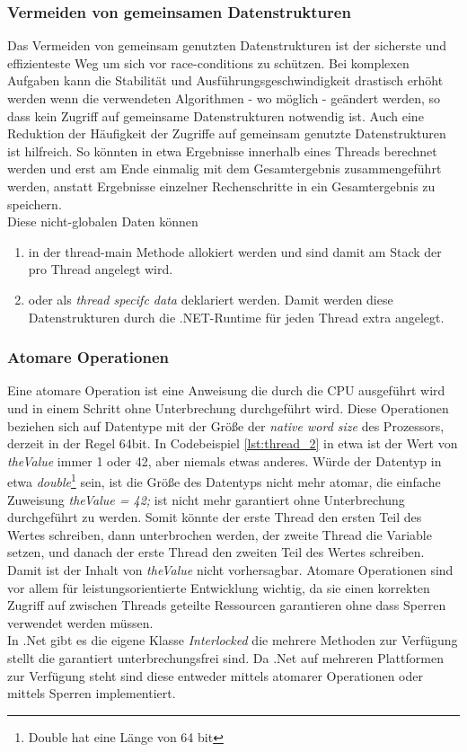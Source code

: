 \subsubsection{Vermeiden von gemeinsamen Datenstrukturen}	
Das Vermeiden von gemeinsam genutzten Datenstrukturen ist der sicherste und effizienteste Weg um sich vor race-conditions zu schützen. Bei komplexen Aufgaben kann die Stabilität und Ausführungsgeschwindigkeit drastisch erhöht werden wenn die verwendeten Algorithmen - wo möglich - geändert werden, so dass kein Zugriff auf gemeinsame Datenstrukturen notwendig ist. Auch eine Reduktion der Häufigkeit der Zugriffe auf gemeinsam genutzte Datenstrukturen ist hilfreich. So könnten in etwa Ergebnisse innerhalb eines Threads berechnet werden und erst am Ende einmalig mit dem Gesamtergebnis zusammengeführt werden, anstatt Ergebnisse einzelner Rechenschritte in ein Gesamtergebnis zu speichern.
\\Diese nicht-globalen Daten können
\begin{enumerate}
	\item in der thread-main Methode allokiert werden und sind damit am Stack der pro Thread angelegt wird.
	\item oder als \textit{thread specifc data} deklariert werden. Damit werden diese Datenstrukturen durch die .NET-Runtime für jeden Thread extra angelegt.
\end{enumerate}

\subsubsection{Atomare Operationen}	
Eine atomare Operation ist eine Anweisung die durch die CPU ausgeführt wird und in einem Schritt ohne Unterbrechung durchgeführt wird. Diese Operationen beziehen sich auf Datentype mit der Größe der \textit{native word size} des Prozessors\parencite[S. 102]{ecma335}, derzeit in der Regel 64bit. In Codebeispiel \ref{lst:thread_2}  in etwa ist der Wert von \textit{theValue} immer 1 oder 42, aber niemals etwas anderes. Würde der Datentyp in etwa \textit{double}\footnote{Double hat eine Länge von 64 bit} sein, ist die Größe des Datentyps nicht mehr atomar, die einfache Zuweisung \textit{theValue = 42;} ist nicht mehr garantiert ohne Unterbrechung durchgeführt zu werden. Somit könnte der erste Thread den ersten Teil des Wertes schreiben, dann unterbrochen werden, der zweite Thread die Variable setzen, und danach der erste Thread den zweiten Teil des Wertes schreiben. Damit ist der Inhalt von \textit{theValue} nicht vorhersagbar. Atomare Operationen sind vor allem für leistungsorientierte Entwicklung wichtig, da sie einen korrekten Zugriff auf zwischen Threads geteilte Ressourcen garantieren ohne dass Sperren verwendet werden müssen.
\\In .Net gibt es die eigene Klasse \textit{Interlocked} die mehrere Methoden zur Verfügung stellt die garantiert unterbrechungsfrei sind. Da .Net auf mehreren Plattformen zur Verfügung steht sind diese entweder mittels atomarer Operationen oder mittels Sperren implementiert.

